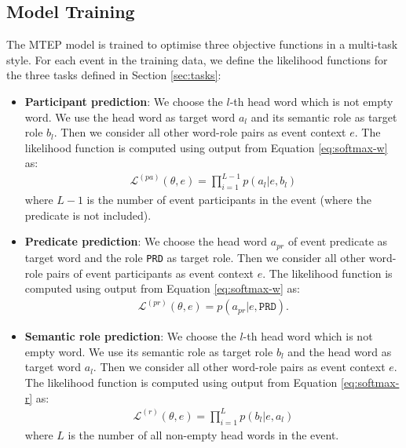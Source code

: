 \documentclass[a4paper]{article}
\begin{document}
\subsection{Model Training} \label{sec:training}
The MTEP model is trained to optimise three objective functions in a multi-task style. For each event in the training data, we define the likelihood functions for the three tasks defined in Section \ref{sec:tasks}:
\begin{itemize}
  \item  \textbf{Participant prediction}: We choose the $l$-th head word which is not empty word. We use the head word as target word $a_l$ and its semantic role as target role $b_l$. Then we consider all other word-role pairs as event context $e$. The likelihood function is computed using output from Equation \eqref{eq:softmax-w} as:
  \begin{equation} \label{eq:likelihood-pa}
  \begin{aligned}
  \mathcal{L}^{(pa)}(\theta, e) = \prod_{i = 1}^{L-1} p(a_l | e, b_l)
  \end{aligned}
  \end{equation}
where $L-1$ is the number of event participants in the event (where the predicate is not included). 

  \item  \textbf{Predicate prediction}: We choose the head word $a_{pr}$ of event predicate as target word and the role \texttt{PRD} as target role. Then we consider all other word-role pairs of event participants as event context $e$. The likelihood function is computed using output from Equation \eqref{eq:softmax-w} as:
  \begin{equation} \label{eq:likelihood-pr}
  \begin{aligned}
  \mathcal{L}^{(pr)}(\theta, e) = p(a_{pr} | e, \texttt{PRD}). 
  \end{aligned}
  \end{equation}

  \item  \textbf{Semantic role prediction}: We choose the $l$-th  head word which is not empty word. We use its semantic role as target role $b_l$ and the head word as target word $a_l$. Then we consider all other word-role pairs as event context $e$. The likelihood function is computed using output from Equation \eqref{eq:softmax-r} as:
  \begin{equation} \label{eq:likelihood-r}
  \begin{aligned}
  \mathcal{L}^{(r)}(\theta, e) = \prod_{i = 1}^{L} p(b_l | e, a_l)
  \end{aligned}
  \end{equation}
where $L$ is the number of all non-empty head words in the event. 
\end{itemize}
\end{document}
